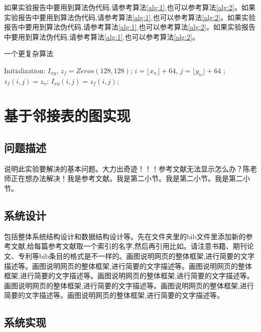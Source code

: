 \documentclass[supercite]{Experimental_Report}
\theoremstyle{definition}
\begin{document}
如果实验报告中要用到算法伪代码,请参考算法\ref{alg:1},也可以参考算法\ref{alg:2}。如果实验报告中要用到算法伪代码,请参考算法\ref{alg:1},也可以参考算法\ref{alg:2}。如果实验报告中要用到算法伪代码,请参考算法\ref{alg:1},也可以参考算法\ref{alg:2}。如果实验报告中要用到算法伪代码,请参考算法\ref{alg:1},也可以参考算法\ref{alg:2}。

\begin{algorithm}[h] 
	\caption{一个更复杂算法}
	\begin{algorithmic}[1]
		\State Initialization: $I_{xy}$, $z_{f}=Zeros(128, 128)$; 
		\State $i=\lfloor x_n \rfloor+64$, $j=\lfloor y_n \rfloor + 64$
		;
		\State $z_{f}(i,j)=z_n$;
		\EndIf
		\State $I_{xy}(i,j)=z_{f}(i,j)$;
		\EndFor 
	\end{algorithmic}\label{alg:2}
\end{algorithm}

\newpage

\section{基于邻接表的图实现}

\subsection{问题描述}

说明此实验要解决的基本问题。大力出奇迹！！！参考文献无法显示怎么办？陈老师正在想办法解决\cite{STR2021Neurocom, AVS2021Neurocom}！我是参考文献。我是第二小节\cite{Mehrabian1974An}。我是第二小节\cite{Rezaei2014CVPR}。我是第二小节\cite{Ramnath2008IJCV}。

\subsection{系统设计}

包括整体系统结构设计和数据结构设计等。先在文件夹里的bib文件里添加新的参考文献,给每篇参考文献取一个索引的名字,然后再引用比如\cite{STR2021Neurocom}\cite{AVS2021Neurocom, Rezaei2014CVPR}。请注意书籍、期刊论文、专利等bib条目的格式是不一样的。画图说明网页的整体框架,进行简要的文字描述等。画图说明网页的整体框架,进行简要的文字描述等。画图说明网页的整体框架,进行简要的文字描述等。画图说明网页的整体框架,进行简要的文字描述等。画图说明网页的整体框架,进行简要的文字描述等。画图说明网页的整体框架,进行简要的文字描述等。画图说明网页的整体框架,进行简要的文字描述等。

\subsection{系统实现}
\end{document}
